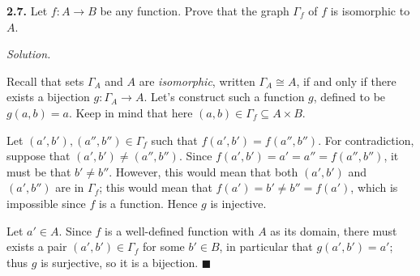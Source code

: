 \documentclass[14pt,parskip=full]{scrartcl}
\newcommand{\exercise}[3]{
\noindent
\textbf{#1.} #2

\noindent
\textit{Solution.}{\let\tpar\par \let\par\relax #3}
}
\newcommand*{\QEDA}{\hfill\ensuremath{\blacksquare}}
\begin{document}
\exercise{2.7}{Let $f:A\to B$ be any function. Prove that the graph $\Gamma_f$
of $f$ is isomorphic to $A$.}{

Recall that sets $\Gamma_A$ and $A$ are \textit{isomorphic}, written
$\Gamma_A\cong A$, if and only if there exists a bijection $g:\Gamma_A\to A$.
Let's construct such a function $g$, defined to be $g(a,b) = a$. Keep in mind
that here $(a,b)\in\Gamma_f\subseteq A\times B$.

\tpar
Let $(a',b'),(a'',b'')\in\Gamma_f$ such that $f(a',b') = f(a'',b'')$. For
contradiction, suppose that $(a',b')\neq (a'',b'')$. Since $f(a',b') = a' = a''
= f(a'',b'')$, it must be that $b'\neq b''$. However, this would mean that both
$(a',b')$ and $(a',b'')$ are in $\Gamma_f$; this would mean that $f(a') = b'
\neq b'' = f(a')$, which is impossible since $f$ is a function. Hence $g$ is
injective.

\tpar
Let $a'\in A$. Since $f$ is a well-defined function with $A$ as its domain,
there must exists a pair $(a',b')\in\Gamma_f$ for some $b'\in B$, in particular
that $g(a',b') = a'$; thus $g$ is surjective, so it is a bijection.
\QEDA

}
\end{document}
